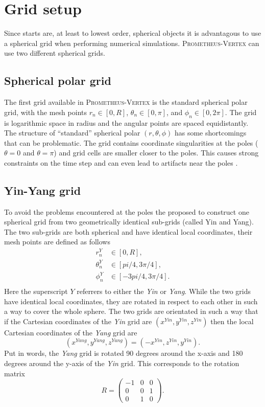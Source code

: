 \section{Grid setup}
Since starts are, at least to lowest order, spherical objects it is 
advantagous to use a spherical grid when performing numerical simulations.
\textsc{Prometheus-Vertex} can use two different spherical grids.

\subsection{Spherical polar grid}
The first grid available in \textsc{Prometheus-Vertex} is the standard spherical polar grid, 
with the mesh points $r_n \in [0, R]$, $\theta_n \in [0, \pi]$, and $\phi_n \in [0, 2\pi]$.
The grid is logarithmic space in radius and the angular points are spaced equidistantly.  
The structure of ``standard'' spherical polar $(r, \theta, \phi)$ has some shortcomings that can be
problematic. The grid contains coordinate singularities at the poles ($\theta = 0$ and $\theta = \pi$)
and grid cells are smaller closer to the poles. This causes strong constraints on the time step and
can even lead to artifacts near the poles \citep{wongwathanarat_10a,mueller_15b}.

\subsection{Yin-Yang grid}
To avoid the problems encountered at the poles the \cite{kageyama_04} proposed to
construct one spherical grid from two geometrically identical sub-grids (called Yin and Yang). 
The two sub-grids are both spherical and have identical local coordinates, their mesh points are defined as follows
\begin{align}
r_n^{Y} &\in [0, R], \\
\theta_n^{Y} &\in [pi/4, 3\pi/4], \\
\phi_n^{Y} &\in [-3pi/4, 3\pi/4]. \\
\end{align} 
Here the superscript $Y$ referrers to either the \textit{Yin} or \textit{Yang}. While the two grids
have identical local coordinates, they are rotated in respect to each other in such a way
to cover the whole sphere. The two grids are orientated in such a way that if 
the Cartesian coordinates of the \textit{Yin} grid are $(x^{Yin},y^{Yin},z^{Yin})$
then the local Cartesian coordinates of the \textit{Yang} grid are
\begin{equation}
(x^{Yang},y^{Yang},z^{Yang}) = (-x^{Yin},z^{Yin},y^{Yin}).
\end{equation} 
Put in words, the \textit{Yang} grid is rotated 90 degrees around the x-axis
and 180 degrees around the y-axis of the \textit{Yin} grid. 
This corresponds to the rotation matrix
\begin{equation} \label{eqT:pij}
R = 
  \begin{pmatrix}
    -1 & 0 & 0  \\
    0 & 0 & 1 \\
    0 & 1 & 0
  \end{pmatrix}.
\end{equation}

